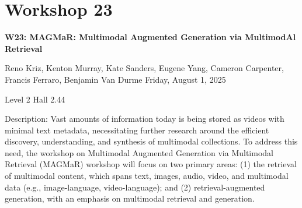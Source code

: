 \clearpage


\section[W23: MAGMaR: Multimodal Augmented Generation via MultimodAl Retrieval ]{Workshop 23}

\begin{center}
    {\Large \textbf{W23: MAGMaR: Multimodal Augmented Generation via MultimodAl Retrieval }}

Reno Kriz, Kenton Murray, Kate Sanders, Eugene Yang, Cameron Carpenter, Francis Ferraro, Benjamin Van Durme
    Friday, August 1, 2025

  Level 2 Hall 2.44
    
\end{center}

Description: Vast amounts of information today is being stored as videos with minimal text metadata, necessitating further research around the efficient discovery, understanding, and synthesis of multimodal collections. To address this need, the workshop on Multimodal Augmented Generation via Multimodal Retrieval (MAGMaR) workshop will focus on two primary areas: (1) the retrieval of multimodal content, which spans text, images, audio, video, and multimodal data (e.g., image-language, video-language); and (2) retrieval-augmented generation, with an emphasis on multimodal retrieval and generation.

